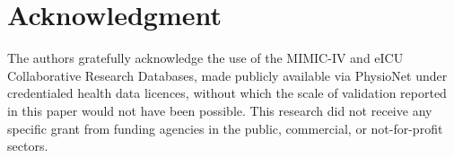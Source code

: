 \documentclass[journal]{IEEEtran}
\begin{document}
	
	\section*{Acknowledgment}
	The authors gratefully acknowledge the use of the MIMIC-IV and eICU Collaborative Research Databases, made publicly available via PhysioNet under credentialed health data licences, without which the scale of validation reported in this paper would not have been possible. This research did not receive any specific grant from funding agencies in the public, commercial, or not-for-profit sectors.

	
	
	
\end{document}
